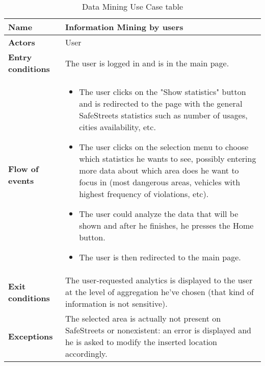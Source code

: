 \begin{table}[!htbp]
	\centering
	\begin{tabular}{lp{9cm}}
\bf\large Name&\bf\large Information Mining by users\\
\hline
\hline
\bf Actors&User\\
\hline
\bf Entry conditions&The user is logged in and is in the main page.\\
\hline
\bf Flow of events&
\begin{itemize}

\item The user clicks on the "Show statistics" button and is redirected to the page with the general SafeStreets statistics such as number of usages, cities availability, etc.

\item The user clicks on the selection menu to choose which statistics he wants to see, possibly entering more data about which area does he want to focus in (most dangerous areas, vehicles with highest frequency of violations, etc).

\item The user could analyze the data that will be shown and after he finishes, he presses the Home button.

\item The user is then redirected to the main page.

\end{itemize}
\\
\hline
\bf Exit conditions&The user-requested analytics is displayed to the user at the level of aggregation he've chosen (that kind of information is not sensitive).\\
\hline
\bf Exceptions&The selected area is actually not present on SafeStreets or nonexistent: an error is displayed and he is asked to modify the inserted location accordingly.
\\
\hline

\end{tabular}
\caption{Data Mining Use Case table}
 \label{tab:dataminingtab}
\end{table}
